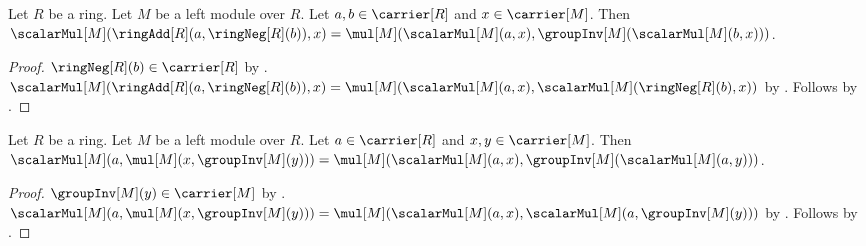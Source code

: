 \begin{theorem}\label{module_scalar_subtraction}
    Let $R$ be a ring.
    Let $M$ be a left module over $R$.
    Let $a,b\in\carrier[R]$ and $x\in\carrier[M]$.
    Then
        $\scalarMul[M](\ringAdd[R](a,\ringNeg[R](b)),x)
            =\mul[M](\scalarMul[M](a,x),
                \groupInv[M](\scalarMul[M](b,x)))$.
\end{theorem}
\begin{proof}
    $\ringNeg[R](b)\in\carrier[R]$ by .
    $\scalarMul[M](\ringAdd[R](a,\ringNeg[R](b)),x)
        =\mul[M](\scalarMul[M](a,x),
            \scalarMul[M](\ringNeg[R](b),x))$ by
        .
    Follows by .
\end{proof}

\begin{theorem}\label{module_vector_subtraction_scalar}
    Let $R$ be a ring.
    Let $M$ be a left module over $R$.
    Let $a\in\carrier[R]$ and $x,y\in\carrier[M]$.
    Then
        $\scalarMul[M](a,\mul[M](x,\groupInv[M](y)))
            =\mul[M](\scalarMul[M](a,x),
                \groupInv[M](\scalarMul[M](a,y)))$.
\end{theorem}
\begin{proof}
    $\groupInv[M](y)\in\carrier[M]$ by
        .
    $\scalarMul[M](a,\mul[M](x,\groupInv[M](y)))
        =\mul[M](\scalarMul[M](a,x),
            \scalarMul[M](a,\groupInv[M](y)))$ by
        .
    Follows by .
\end{proof}

